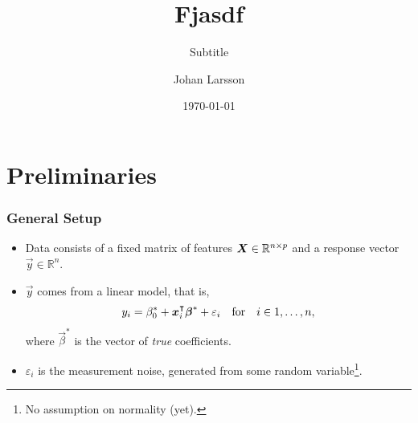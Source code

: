 \documentclass[10pt]{beamer}
\date{\today}
\title{Fjasdf}
\subtitle{Subtitle}
\author{Johan Larsson}
\institute{Department of Statistics, Lund University}
\begin{document}
\maketitle

%

\section{Preliminaries}

\begin{frame}
  \frametitle{General Setup}

  \begin{itemize}
    \item Data consists of a \alert{fixed} matrix of features \(\boldsymbol{X} \in \mathbb{R}^{n \times p}\) and a response vector \(\vec{y} \in \mathbb{R}^n\).
    \item \(\vec{y}\) comes from a linear model, that is,
          \[
            y_i = \beta_0^* + \boldsymbol x_i^\intercal \boldsymbol\beta^* + \varepsilon_i \quad\text{for} \quad i \in 1,\dots,n,
          \]
          where \(\vec{\beta}^*\) is the vector of \emph{true} coefficients.
    \item \(\varepsilon_i\) is the measurement noise, generated from some random variable\footnote{No assumption on normality (yet).}.
  \end{itemize}
\end{frame}
\end{document}

